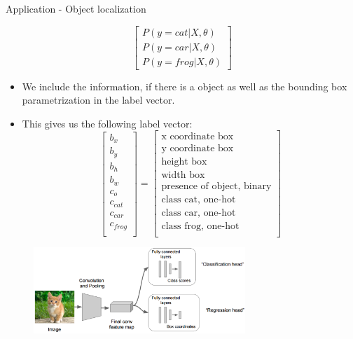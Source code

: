 \begin{vbframe}{Application - Object localization}
\begin{itemize}
$$            \begin{bmatrix}
            P(y = cat|X, \theta)\\
            P(y = car|X, \theta)\\
            P(y = frog|X, \theta)
            \end{bmatrix}
            $$
                \end{itemize}
            \framebreak
            \begin{itemize}
            \item We include the information, if there is a object as well as the bounding box parametrization in the label vector.
            \item This gives us the following label vector:
                $$
                \begin{bmatrix}
            b_x\\
            b_y \\
            b_h \\
            b_w\\
            c_o \\
            c_{cat} \\
            c_{car} \\
            c_{frog} \\
            \end{bmatrix} =             
                \begin{bmatrix}
            \text{x coordinate box}\\
            \text{y coordinate box} \\
            \text{height box} \\
            \text{width box}\\
            \text{presence of object, binary} \\
            \text{class cat, one-hot} \\
            \text{class car, one-hot}\\
            \text{class frog, one-hot} \\
            \end{bmatrix}
            $$
                \end{itemize}
            \framebreak
            \begin{figure}
            \centering
            \includegraphics[width=8cm]{plots/application/naive_localization.png}

\end{figure}
\end{vbframe}
